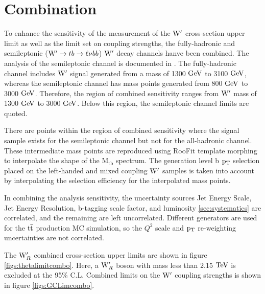 \chapter{Combination}
\label{sec:combo}
To enhance the sensitivity of the measurement of the $\mathrm{W}^\prime$ cross-section upper limit as well as the limit set on coupling strengths, the fully-hadronic and 
semileptonic ($\mathrm{W}^\prime \to tb \to \ell\nu bb$) $\mathrm{W}^\prime$ decay channels hanve been combined.  
The analysis of the semileptonic channel is documented in \cite{Chatrchyan:2014koa}.  The fully-hadronic channel includes $\mathrm{W}^\prime$ signal generated from a 
mass of 1300 $\mathrm{GeV}$ to 3100 $\mathrm{GeV}$, whereas the semileptonic channel has mass points generated from 800 $\mathrm{GeV}$ to 3000 $\mathrm{GeV}$.  Therefore, the region of 
combined sensitivity ranges from $\mathrm{W}^\prime$ mass of 1300 $\mathrm{GeV}$ to 3000 $\mathrm{GeV}$.  Below this region, the semileptonic channel limits are quoted.  

There are points within the region of combined sensitivity where the signal sample exists for the semileptonic channel but not for the all-hadronic channel.  These 
intermediate mass points are reproduced using RooFit template morphing to interpolate the shape of the $\mathrm{M_{tb}}$ spectrum.  
The generation level b $\mathrm{p_{T}}$ selection placed on the left-handed and mixed coupling $\mathrm{W}^\prime$ samples is taken into account by interpolating the 
selection efficiency for the interpolated mass points.

In combining the analysis sensitivity, the uncertainty sources Jet Energy Scale, 
Jet Energy Resolution, b-tagging scale factor, and luminosity \ref{sec:systematics} are correlated, and the remaining are left uncorrelated.  
Different generators are used for the $\mathrm{t\overline{t}}$ production MC simulation, so the $Q^2$ scale and $\mathrm{p_{T}}$ re-weighting uncertainties are not correlated.

The $\mathrm{W}^\prime_{R}$ combined cross-section upper limits are shown in figure \ref{figs:thetalimitcombo}.  Here, a $\mathrm{W}^\prime_{R}$ boson with mass less than 2.15 $\mathrm{TeV}$ is excluded at the 95\% C.L.  
Combined limits on the $\mathrm{W}^\prime$ coupling strengths is shown in figure \ref{figs:GCLimcombo}.

